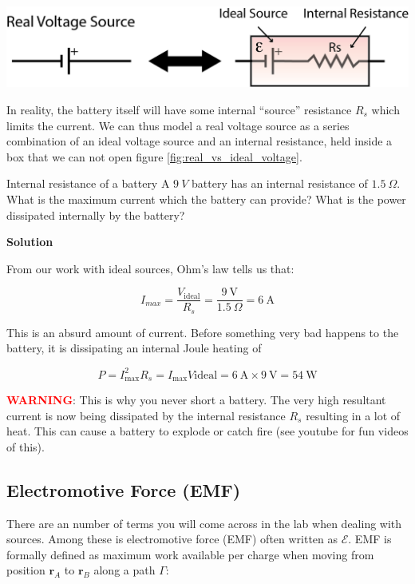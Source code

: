 \documentclass{tufte-book}
\newcommand\Solution{\par\textbf{\textsf{Solution}}\par\medskip}
\begin{document}
\begin{marginfigure}
\caption{A real voltage source is modelled as an ideal source in series with an internal resistance.}
\label{fig:real_vs_ideal_voltage}
\includegraphics{real_vs_ideal_voltage}
\end{marginfigure}

In reality, the battery itself will have some internal ``source'' resistance $R_s$ which limits the current. We can thus model a real voltage source as a series combination of an ideal voltage source and an internal resistance, held inside a box that we can not open figure \ref{fig:real_vs_ideal_voltage}.



\begin{myexample}[label = ex:popquiz_intresistance]{Internal resistance of a battery}
A $9~V$ battery has an internal resistance of $1.5~\Omega$. What is the maximum current which the battery can provide? What is the power dissipated internally by the battery?

\Solution
From our work with ideal sources, Ohm's law tells us that:

$$
I_{max} = \frac{V_\text{ideal}}{R_s} = \frac{9~\text{V}}{1.5~\Omega} = 6~\text{A}
$$

\noindent This is an absurd amount of current. Before something very bad happens to the battery, it is dissipating an internal Joule heating of

$$
P = I^2_\text{max}R_s = I_\text{max}V\text{ideal} = 6~\text{A}\times9~\text{V} = 54~\text{W}
$$
\end{myexample}

\noindent  \textcolor{red}{\textbf{WARNING}}: This is why you never short a battery. The very high resultant current is now being dissipated by the internal resistance $R_s$ resulting in a lot of heat. This can cause a battery to explode or catch fire (see youtube for fun videos of this).

\subsection{Electromotive Force (EMF)}
There are an number of terms you will come across in the lab when dealing with sources. Among these is electromotive force (EMF) often written as $\mathcal{E}$. EMF is formally defined as maximum work available per charge when moving from position $\textbf{r}_A$ to $\textbf{r}_B$ along a path $\Gamma$:
\end{document}
